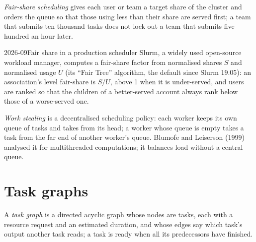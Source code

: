 \begin{definition}\label{def:pl:distributed-compute-and-schedulers:fairshare}
\emph{Fair-share scheduling} gives each user or team a target share of the cluster and orders the queue so that
those using less than their share are served first; a team that submits ten thousand tasks does not lock out a team that submits five hundred
an hour later.
\end{definition}

\label{lst:pl:distributed-compute-and-schedulers:fairshare}

\begin{dated}{2026-09}{Fair share in a production scheduler}\label{dat:pl:distributed-compute-and-schedulers:slurm}
Slurm, a widely used open-source workload manager, computes a fair-share factor from normalised shares $S$ and normalised usage $U$
(its ``Fair Tree'' algorithm, the default since Slurm 19.05): an association's level fair-share is $S/U$, above 1 when it is under-served,
and users are ranked so that the children of a better-served account always rank below those of a worse-served one.
\end{dated}

\begin{definition}\label{def:pl:distributed-compute-and-schedulers:stealing}
\emph{Work stealing} is a decentralised scheduling policy: each worker keeps its own queue of tasks and takes from its
head; a worker whose queue is empty takes a task from the far end of another worker's queue. Blumofe and Leiserson (1999) analysed it
for multithreaded computations; it balances load without a central queue.
\end{definition}

\label{lst:pl:distributed-compute-and-schedulers:stealing}

\section{Task graphs}

\begin{definition}\label{def:pl:distributed-compute-and-schedulers:graph}
A \emph{task graph} is a directed acyclic graph whose nodes are tasks, each with a resource request and an estimated
duration, and whose edges say which task's output another task reads; a task is ready when all its predecessors have finished.
\end{definition}

